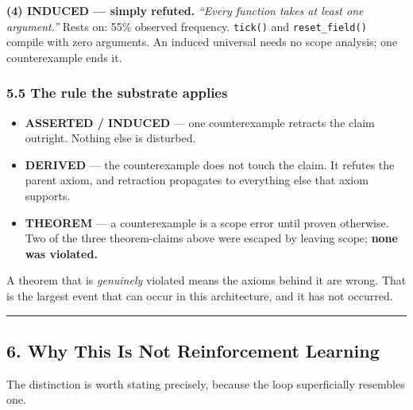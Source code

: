 \documentclass[
  11pt,
  a4paper,
]{article}
\providecommand{\tightlist}{%
  \setlength{\itemsep}{0pt}\setlength{\parskip}{0pt}}
\begin{document}
\textbf{(4) INDUCED --- simply refuted.} \emph{``Every function takes at
least one argument.''} Rests on: 55\% observed frequency.
\texttt{tick()} and \texttt{reset\_field()} compile with zero arguments.
An induced universal needs no scope analysis; one counterexample ends
it.

\subsubsection{5.5 The rule the substrate
applies}\label{the-rule-the-substrate-applies}

\begin{itemize}
\tightlist
\item
  \textbf{ASSERTED / INDUCED} --- one counterexample retracts the claim
  outright. Nothing else is disturbed.
\item
  \textbf{DERIVED} --- the counterexample does not touch the claim. It
  refutes the parent axiom, and retraction propagates to everything else
  that axiom supports.
\item
  \textbf{THEOREM} --- a counterexample is a scope error until proven
  otherwise. Two of the three theorem-claims above were escaped by
  leaving scope; \textbf{none was violated.}
\end{itemize}

A theorem that is \emph{genuinely} violated means the axioms behind it
are wrong. That is the largest event that can occur in this
architecture, and it has not occurred.

\begin{center}\rule{0.5\linewidth}{0.5pt}\end{center}

\subsection{6. Why This Is Not Reinforcement
Learning}\label{why-this-is-not-reinforcement-learning}

The distinction is worth stating precisely, because the loop
superficially resembles one.
\end{document}
